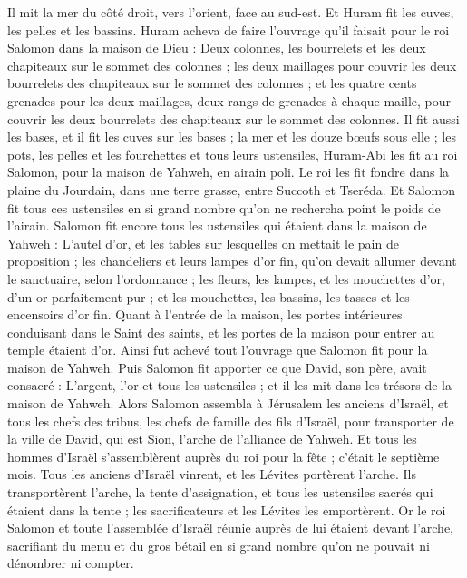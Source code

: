 \begin{multicols}{2}
Il mit la mer du côté droit, vers l'orient, face au sud-est.
Et Huram fit les cuves, les pelles et les bassins. Huram acheva de faire l'ouvrage qu'il faisait pour le roi Salomon dans la maison de Dieu :
Deux colonnes, les bourrelets et les deux chapiteaux sur le sommet des colonnes ; les deux maillages pour couvrir les deux bourrelets des chapiteaux sur le sommet des colonnes ;
et les quatre cents grenades pour les deux maillages, deux rangs de grenades à chaque maille, pour couvrir les deux bourrelets des chapiteaux sur le sommet des colonnes.
Il fit aussi les bases, et il fit les cuves sur les bases ;
la mer et les douze bœufs sous elle ;
les pots, les pelles et les fourchettes et tous leurs ustensiles, Huram-Abi les fit au roi Salomon, pour la maison de Yahweh, en airain poli.
Le roi les fit fondre dans la plaine du Jourdain, dans une terre grasse, entre Succoth et Tseréda.
Et Salomon fit tous ces ustensiles en si grand nombre qu'on ne rechercha point le poids de l'airain.
Salomon fit encore tous les ustensiles qui étaient dans la maison de Yahweh : L'autel d'or, et les tables sur lesquelles on mettait le pain de proposition ;
les chandeliers et leurs lampes d'or fin, qu'on devait allumer devant le sanctuaire, selon l'ordonnance ;
les fleurs, les lampes, et les mouchettes d'or, d'un or parfaitement pur ;
et les mouchettes, les bassins, les tasses et les encensoirs d'or fin. Quant à l'entrée de la maison, les portes intérieures conduisant dans le Saint des saints, et les portes de la maison pour entrer au temple étaient d'or.
\VerseOne{}Ainsi fut achevé tout l'ouvrage que Salomon fit pour la maison de Yahweh. Puis Salomon fit apporter ce que David, son père, avait consacré : L'argent, l'or et tous les ustensiles ; et il les mit dans les trésors de la maison de Yahweh.
Alors Salomon assembla à Jérusalem les anciens d'Israël, et tous les chefs des tribus, les chefs de famille des fils d’Israël, pour transporter de la ville de David, qui est Sion, l'arche de l'alliance de Yahweh.
Et tous les hommes d'Israël s’assemblèrent auprès du roi pour la fête ; c'était le septième mois.
Tous les anciens d'Israël vinrent, et les Lévites portèrent l'arche.
Ils transportèrent l'arche, la tente d'assignation, et tous les ustensiles sacrés qui étaient dans la tente ; les sacrificateurs et les Lévites les emportèrent.
Or le roi Salomon et toute l'assemblée d'Israël réunie auprès de lui étaient devant l'arche, sacrifiant du menu et du gros bétail en si grand nombre qu’on ne pouvait ni dénombrer ni compter.

\end{multicols}
